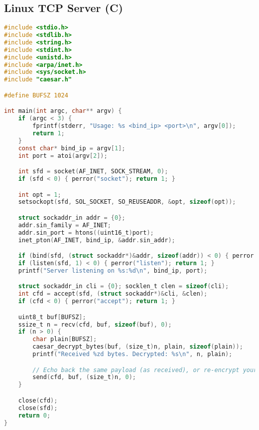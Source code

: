 \documentclass[11pt]{article}
\begin{document}
\subsection*{Linux TCP Server (C)}
\begin{lstlisting}[language=C, caption={server.c (Linux)}]
#include <stdio.h>
#include <stdlib.h>
#include <string.h>
#include <stdint.h>
#include <unistd.h>
#include <arpa/inet.h>
#include <sys/socket.h>
#include "caesar.h"

#define BUFSZ 1024

int main(int argc, char** argv) {
    if (argc < 3) {
        fprintf(stderr, "Usage: %s <bind_ip> <port>\n", argv[0]);
        return 1;
    }
    const char* bind_ip = argv[1];
    int port = atoi(argv[2]);

    int sfd = socket(AF_INET, SOCK_STREAM, 0);
    if (sfd < 0) { perror("socket"); return 1; }

    int opt = 1;
    setsockopt(sfd, SOL_SOCKET, SO_REUSEADDR, &opt, sizeof(opt));

    struct sockaddr_in addr = {0};
    addr.sin_family = AF_INET;
    addr.sin_port = htons((uint16_t)port);
    inet_pton(AF_INET, bind_ip, &addr.sin_addr);

    if (bind(sfd, (struct sockaddr*)&addr, sizeof(addr)) < 0) { perror("bind"); return 1; }
    if (listen(sfd, 1) < 0) { perror("listen"); return 1; }
    printf("Server listening on %s:%d\n", bind_ip, port);

    struct sockaddr_in cli = {0}; socklen_t clen = sizeof(cli);
    int cfd = accept(sfd, (struct sockaddr*)&cli, &clen);
    if (cfd < 0) { perror("accept"); return 1; }

    uint8_t buf[BUFSZ];
    ssize_t n = recv(cfd, buf, sizeof(buf), 0);
    if (n > 0) {
        char plain[BUFSZ];
        caesar_decrypt_bytes(buf, (size_t)n, plain, sizeof(plain));
        printf("Received %zd bytes. Decrypted: %s\n", n, plain);

        // Echo back the same payload (as received), or re-encrypt your own reply:
        send(cfd, buf, (size_t)n, 0);
    }

    close(cfd);
    close(sfd);
    return 0;
}
\end{lstlisting}
\end{document}
